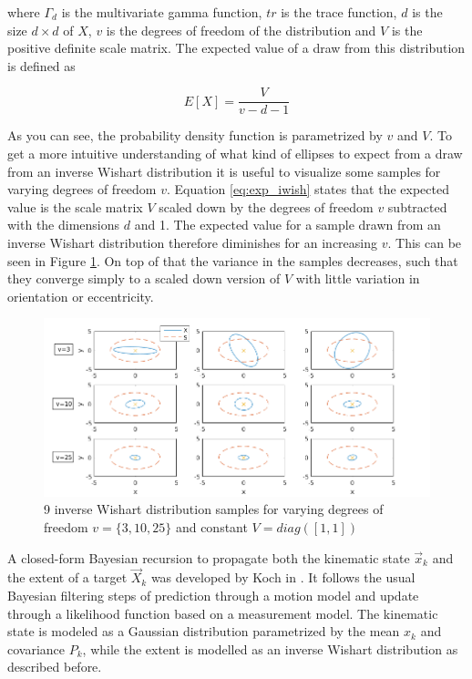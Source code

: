 where $\Gamma_d$ is the multivariate gamma function, $tr$ is the trace function, $d$ is the size $d \times d$ of $X$, $v$ is the degrees of freedom of the distribution and $V$ is the positive definite scale matrix. The expected value of a draw from this distribution is defined as

\begin{equation}
    E[X] = \frac{V}{v-d-1}
    \label{eq:exp_iwish}
\end{equation}

As you can see, the probability density function is parametrized by $v$ and $V$. To get a more intuitive understanding of what kind of ellipses to expect from a draw from an inverse Wishart distribution it is useful to visualize some samples for varying degrees of freedom $v$. Equation \eqref{eq:exp_iwish} states that the expected value is the scale matrix $V$ scaled down by the degrees of freedom $v$ subtracted with the dimensions $d$ and 1. The expected value for a sample drawn from an inverse Wishart distribution therefore diminishes for an increasing $v$. This can be seen in Figure \ref{fig:iwish_parameters_ex}. On top of that the variance in the samples decreases, such that they converge simply to a scaled down version of $V$ with little variation in orientation or eccentricity.

\begin{figure}[H]
    \centering
    \includegraphics[width=0.9\linewidth]{include/images/iwish_parameters_ex.png}
    \caption{9 inverse Wishart distribution samples for varying degrees of freedom $v = \{3,10,25\}$ and constant $V = diag([1,1])$}
    \label{fig:iwish_parameters_ex}
\end{figure}

A closed-form Bayesian recursion to propagate both the kinematic state $\vec{x}_k$ and the extent of a target $\vec{X}_k$ was developed by Koch in \cite{koch2008elliptical}. It follows the usual Bayesian filtering steps of prediction through a motion model and update through a likelihood function based on a measurement model. The kinematic state is modeled as a Gaussian distribution parametrized by the mean $x_k$ and covariance $P_k$, while the extent is modelled as an inverse Wishart distribution as described before.

